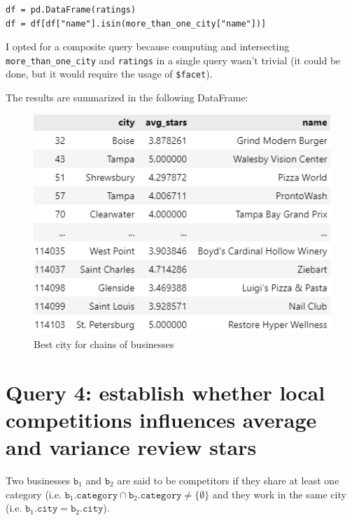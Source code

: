 \documentclass{Configuration_Files/PoliMi3i_thesis}
\begin{document}
\bigskip 

\begin{verbatim}
df = pd.DataFrame(ratings)
df = df[df["name"].isin(more_than_one_city["name"])]
\end{verbatim}

\bigskip

I opted for a composite query because computing and intersecting \texttt{more\_than\_one\_city} and \texttt{ratings} in a single query wasn't trivial (it could be done, but it would require the usage of \texttt{\$facet}).

The results are summarized in the following DataFrame:

\bigskip

\begin{figure}[H]
    \centering
    \includegraphics[width=2\columnwidth / 3]{imgs/query_4_table.png}
    \caption{Best city for chains of businesses}
    \label{fig:query_4}
\end{figure}

\bigskip

\section{Query 4: establish whether local competitions influences average and variance review stars}
Two businesses $\texttt{b}_1$ and $\texttt{b}_2$ are said to be competitors if they share at least one category (i.e. $\texttt{b}_1\texttt{.category} \cap \texttt{b}_2\texttt{.category} \neq \{\emptyset\}$ and they work in the same city (i.e. $\texttt{b}_1\texttt{.city} = \texttt{b}_2\texttt{.city}$). 
\end{document}
